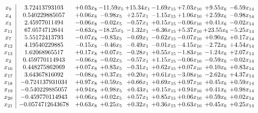 \documentclass[8pt]{article}
\begin{document}
\[\begin{array}{c| c c@{\hskip 2pt} c@{\hskip 2pt} c@{\hskip 2pt} c@{\hskip 2pt} c@{\hskip 2pt} c@{\hskip 2pt} c@{\hskip 2pt} }
 x_{9}   &  3.72413793103 & +  0.03 x_{8} & -11.59 x_{5} & + 15.34 x_{1} & -1.69 x_{15} & +  7.03 x_{10} & +  9.55 x_{6} & -6.59 x_{14}\\
 x_{4}   &  0.540229885057 & +  0.06 x_{8} & -0.98 x_{5} & +  2.57 x_{1} & -1.15 x_{15} & +  1.06 x_{10} & +  2.59 x_{6} & -0.98 x_{14}\\
 x_{3}   &  2.45977011494 & -0.06 x_{8} & -0.02 x_{5} & -0.57 x_{1} & +  0.15 x_{15} & -0.06 x_{10} & +  0.41 x_{6} & -0.02 x_{14}\\
 x_{11}   &  67.0574712644 & -0.63 x_{8} & -18.25 x_{5} & -1.32 x_{1} & -6.36 x_{15} & +  5.37 x_{10} & + 23.55 x_{6} & -5.25 x_{14}\\
 x_{7}   &  5.55172413793 & -0.07 x_{8} & -0.83 x_{5} & -0.69 x_{1} & -0.62 x_{15} & -0.07 x_{10} & +  0.90 x_{6} & +  0.17 x_{14}\\
 x_{12}   &  4.19540229885 & -0.15 x_{8} & -0.46 x_{5} & -0.49 x_{1} & -0.01 x_{15} & -4.15 x_{10} & -2.72 x_{6} & +  4.54 x_{14}\\
 x_{13}   &  1.62068965517 & +  0.17 x_{8} & +  0.07 x_{5} & -0.28 x_{1} & +  0.55 x_{15} & -1.83 x_{10} & -1.24 x_{6} & +  2.07 x_{14}\\
 x_{2}   &  0.459770114943 & -0.06 x_{8} & -0.02 x_{5} & -0.57 x_{1} & +  1.15 x_{15} & -0.06 x_{10} & -0.59 x_{6} & -0.02 x_{14}\\
 x_{16}   &  0.448275862069 & +  0.07 x_{8} & +  0.83 x_{5} & -0.31 x_{1} & +  0.62 x_{15} & +  0.07 x_{10} & +  0.10 x_{6} & +  0.83 x_{14}\\
 x_{17}   &  3.64367816092 & -0.08 x_{8} & +  0.37 x_{5} & +  0.20 x_{1} & +  0.61 x_{15} & -3.08 x_{10} & -2.62 x_{6} & +  4.37 x_{14}\\
 x_{18}   &  -0.724137931034 & +  0.97 x_{8} & +  0.59 x_{5} & +  0.66 x_{1} & +  0.69 x_{15} & +  0.97 x_{10} & +  0.45 x_{6} & +  0.59 x_{14}\\
 x_{19}   &  -0.540229885057 & +  0.94 x_{8} & +  0.98 x_{5} & +  0.43 x_{1} & +  0.15 x_{15} & +  0.94 x_{10} & +  0.41 x_{6} & +  0.98 x_{14}\\
 x_{20}   &  -0.459770114943 & +  0.06 x_{8} & +  0.02 x_{5} & +  0.57 x_{1} & +  0.85 x_{15} & +  0.06 x_{10} & +  0.59 x_{6} & +  0.02 x_{14}\\
 x_{21}   &  -0.0574712643678 & +  0.63 x_{8} & +  0.25 x_{5} & +  0.32 x_{1} & +  0.36 x_{15} & +  0.63 x_{10} & +  0.45 x_{6} & +  0.25 x_{14}\\

\end{array}\]
\end{document}
